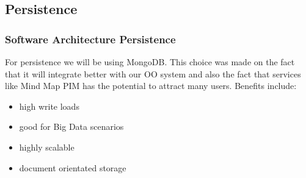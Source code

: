 \documentclass{beamer}
\begin{document}
	\subsection{Persistence}
		\begin{frame}
		\frametitle{Software Architecture Persistence}
			For persistence we will be using MongoDB. This choice was made on the fact that it will integrate better with our OO system and also the fact that services like Mind Map PIM has the potential to attract many users.
			Benefits include:
			\begin{itemize}
				\item high write loads
				\item good for Big Data scenarios
				\item highly scalable
				\item document orientated storage
			\end{itemize}
		\end{frame}
		
\end{document}
